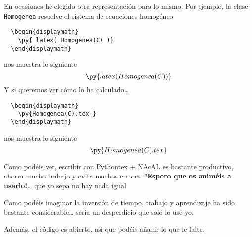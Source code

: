 \documentclass[12pt,a4paper]{article} %
\begin{document}
En ocasiones he elegido otra representación para lo mismo. Por
ejemplo, la clase \texttt{Homogenea} resuelve el sistema de ecuaciones
homogéneo
\begin{Verbatim}
  \begin{displaymath}
    \py{ latex( Homogenea(C) )}
  \end{displaymath}
\end{Verbatim}
nos muestra lo siguiente
\begin{displaymath}
  \py{latex( Homogenea(C) )}
\end{displaymath}
Y si queremos ver cómo lo ha calculado\dots
\begin{Verbatim}
  \begin{displaymath}
    \py{Homogenea(C).tex }
  \end{displaymath}
\end{Verbatim}
nos muestra lo siguiente
\begin{displaymath}
  \py{Homogenea(C).tex }
\end{displaymath}
\bigskip

Como podéis ver, escribir con Pythontex + NAcAL es bastante
productivo, ahorra mucho trabajo y evita muchos
errores. \textbf{!Espero que os animéis a usarlo!}\dots{} que yo sepa
no hay nada igual

Como podéis imaginar la inversión de tiempo, trabajo y aprendizaje ha
sido bastante considerable\dots{} sería un desperdicio que solo lo use
yo.  \bigskip

Además, el código es abierto, así que podéis añadir lo que le falte.
\end{document}

